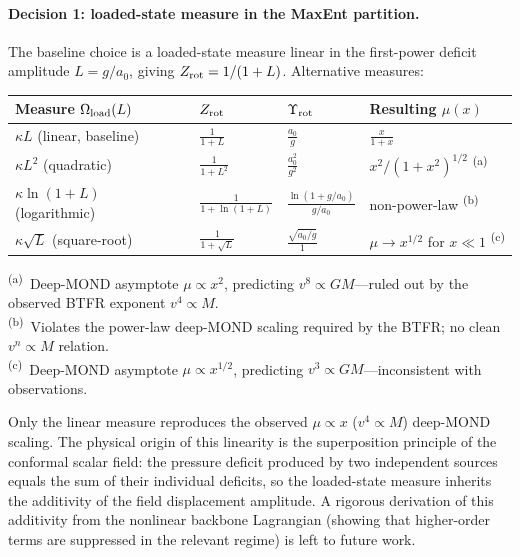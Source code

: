 \documentclass[11pt]{article}
\begin{document}
\paragraph{Decision 1: loaded-state measure in the MaxEnt partition.}
The baseline choice is a loaded-state measure linear in the
first-power deficit amplitude $L=g/a_0$, giving $Z_{\rm rot}=1/(1+L)$.
Alternative measures:
\begin{center}
\begin{tabular}{@{}llll@{}}
\toprule
\textbf{Measure} $\Omega_{\rm load}(L)$ &
  $Z_{\rm rot}$ &
  $\Upsilon_{\rm rot}$ &
  \textbf{Resulting $\mu(x)$} \\
\midrule
$\kappa L$ (linear, baseline) &
  $\displaystyle\frac{1}{1+L}$ &
  $\displaystyle\frac{a_0}{g}$ &
  $\displaystyle\frac{x}{1+x}$ \\[8pt]
$\kappa L^2$ (quadratic) &
  $\displaystyle\frac{1}{1+L^2}$ &
  $\displaystyle\frac{a_0^2}{g^2}$ &
  $x^2/(1+x^2)^{1/2}$ \;\textsuperscript{(a)} \\[8pt]
$\kappa\ln(1+L)$ (logarithmic) &
  $\displaystyle\frac{1}{1+\ln(1\!+\!L)}$ &
  $\displaystyle\frac{\ln(1\!+\!g/a_0)}{g/a_0}$ &
  non-power-law \;\textsuperscript{(b)} \\[8pt]
$\kappa\sqrt{L}$ (square-root) &
  $\displaystyle\frac{1}{1+\sqrt{L}}$ &
  $\displaystyle\frac{\sqrt{a_0/g}}{1}$ &
  $\mu\to x^{1/2}$ for $x\ll1$ \;\textsuperscript{(c)} \\
\bottomrule
\end{tabular}
\end{center}
\noindent\textsuperscript{(a)}~Deep-MOND asymptote
$\mu\propto x^2$, predicting $v^8\propto GM$---ruled out by
the observed BTFR exponent $v^4\propto M$.\\
\textsuperscript{(b)}~Violates the power-law deep-MOND scaling
required by the BTFR; no clean $v^n\propto M$ relation.\\
\textsuperscript{(c)}~Deep-MOND asymptote $\mu\propto x^{1/2}$,
predicting $v^3\propto GM$---inconsistent with observations.

Only the linear measure reproduces the observed $\mu\propto x$
($v^4\propto M$) deep-MOND scaling.  The physical origin of this
linearity is the superposition principle of the conformal scalar
field: the pressure deficit produced by two independent sources
equals the sum of their individual deficits, so the loaded-state
measure inherits the additivity of the field displacement
amplitude.  A rigorous derivation of this additivity from the
nonlinear backbone Lagrangian (showing that higher-order terms are
suppressed in the relevant regime) is left to future work.
\end{document}
